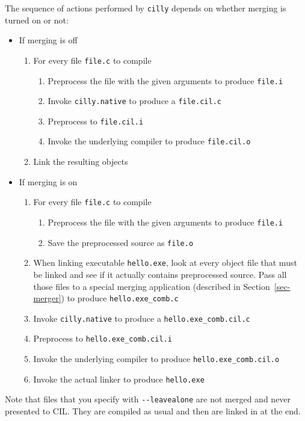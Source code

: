 \documentclass[letterpaper]{article}
\def\secref#1{Section~\ref{sec-#1}}
\def\t#1{{\tt #1}}
\begin{document}
 The sequence of actions performed by \t{cilly} depends on whether merging
is turned on or not:
\begin{itemize}
\item If merging is off
  \begin{enumerate}
    \item For every file \t{file.c} to compile
         \begin{enumerate}
            \item Preprocess the file with the given arguments to
                  produce \t{file.i}
            \item Invoke \t{cilly.native} to produce a \t{file.cil.c}
            \item Preprocess to \t{file.cil.i}
            \item Invoke the underlying compiler to produce \t{file.cil.o}
         \end{enumerate}
    \item Link the resulting objects
  \end{enumerate}
\item If merging is on
  \begin{enumerate}
    \item For every file \t{file.c} to compile
         \begin{enumerate}
            \item Preprocess the file with the given arguments to
                  produce \t{file.i}
            \item Save the preprocessed source as \t{file.o}
         \end{enumerate}
    \item When linking executable \t{hello.exe}, look at every object
          file that must be linked and see if it actually
          contains preprocessed source. Pass all those files to a
          special merging application (described in
          \secref{merger}) to produce \t{hello.exe\_comb.c}
    \item Invoke \t{cilly.native} to produce a \t{hello.exe\_comb.cil.c}
    \item Preprocess to \t{hello.exe\_comb.cil.i}
    \item Invoke the underlying compiler to produce \t{hello.exe\_comb.cil.o}
    \item Invoke the actual linker to produce \t{hello.exe}
  \end{enumerate}
\end{itemize}

 Note that files that you specify with \t{-{}-leavealone} are not merged and
never presented to CIL. They are compiled as usual and then are linked in at
the end.
\end{document}
